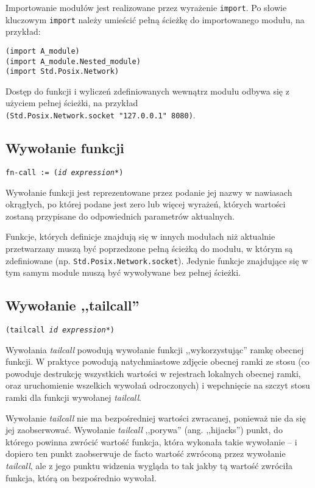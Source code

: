 Importowanie modułów jest realizowane przez wyrażenie \texttt{import}. Po słowie
kluczowym \texttt{import} należy umieścić pełną ścieżkę do importowanego modułu,
na przykład:
\begin{small}
\begin{lstlisting}[caption={Plik \texttt{src/A\_module.lisp}}]
(import A_module)
(import A_module.Nested_module)
(import Std.Posix.Network)
\end{lstlisting}
\end{small}

Dostęp do funkcji i wyliczeń zdefiniowanych wewnątrz modułu odbywa się z użyciem
pełnej ścieżki, na przykład \texttt{(Std.Posix.Network.socket~"127.0.0.1"~8080)}.

\subsection{Wywołanie funkcji}
\label{viuact_spec_fn_call}

\texttt{fn-call := (\emph{id} \emph{expression}*)}
\newline

Wywołanie funkcji jest reprezentowane przez podanie jej nazwy w nawiasach
okrągłych, po której podane jest zero lub więcej wyrażeń, których wartości
zostaną przypisane do odpowiednich parametrów aktualnych.

Funkcje, których definicje znajdują się w innych modułach niż aktualnie
przetwarzany muszą być poprzedzone pełną ścieżką do modułu, w którym są
zdefiniowane (np. \texttt{Std.Posix.Network.socket}). Jedynie funkcje znajdujące
się w tym samym module muszą być wywoływane bez pełnej ścieżki.

\subsection{Wywołanie ,,tailcall''}
\label{viuact_spec_tail_call}

\texttt{(tailcall \emph{id} \emph{expression}*)}
\newline

Wywołania \emph{tailcall} powodują wywołanie funkcji ,,wykorzystując'' ramkę
obecnej funkcji. W praktyce powodują natychmiastowe zdjęcie obecnej ramki ze
stosu (co powoduje destrukcję wszystkich wartości w rejestrach lokalnych obecnej
ramki, oraz uruchomienie wszelkich wywołań odroczonych) i wepchnięcie na szczyt
stosu ramki dla funkcji wywołanej \emph{tailcall}.

Wywołanie \emph{tailcall} nie ma bezpośredniej wartości zwracanej, ponieważ nie
da się jej zaobserwować. Wywołanie \emph{tailcall} ,,porywa'' (ang. ,,hijacks'')
punkt, do którego powinna zwrócić wartość funkcja, która wykonała takie
wywołanie -- i dopiero ten punkt zaobserwuje de facto wartość zwróconą przez
wywołanie \emph{tailcall}, ale z jego punktu widzenia wygląda to tak jakby tą
wartość zwróciła funkcja, którą on bezpośrednio wywołał.

